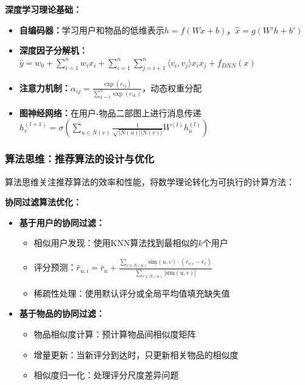 \textbf{深度学习理论基础：}
\begin{itemize}
\item \textbf{自编码器：}学习用户和物品的低维表示$h = f(Wx + b)$，$\hat{x} = g(W'h + b')$
\item \textbf{深度因子分解机：}$\hat{y} = w_0 + \sum_{i=1}^n w_i x_i + \sum_{i=1}^n \sum_{j=i+1}^n \langle v_i, v_j \rangle x_i x_j + f_{DNN}(x)$
\item \textbf{注意力机制：}$\alpha_{ij} = \frac{\exp(e_{ij})}{\sum_{k=1}^n \exp(e_{ik})}$，动态权重分配
\item \textbf{图神经网络：}在用户-物品二部图上进行消息传递$h_v^{(l+1)} = \sigma(\sum_{u \in N(v)} \frac{1}{\sqrt{|N(u)||N(v)|}} W^{(l)} h_u^{(l)})$
\end{itemize}

\subsubsection{算法思维：推荐算法的设计与优化}

算法思维关注推荐算法的效率和性能，将数学理论转化为可执行的计算方法：

\textbf{协同过滤算法优化：}
\begin{itemize}
\item \textbf{基于用户的协同过滤：}
\begin{itemize}
\item 相似用户发现：使用KNN算法找到最相似的$k$个用户
\item 评分预测：$\hat{r}_{u,i} = \bar{r}_u + \frac{\sum_{v \in N(u)} \text{sim}(u,v) \cdot (r_{v,i} - \bar{r}_v)}{\sum_{v \in N(u)} |\text{sim}(u,v)|}$
\item 稀疏性处理：使用默认评分或全局平均值填充缺失值
\end{itemize}
\item \textbf{基于物品的协同过滤：}
\begin{itemize}
\item 物品相似度计算：预计算物品间相似度矩阵
\item 增量更新：当新评分到达时，只更新相关物品的相似度
\item 相似度归一化：处理评分尺度差异问题
\end{itemize}
\end{itemize}

